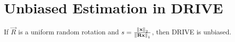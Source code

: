 \documentclass[twoside]{article}
\begin{document}



\section{Unbiased Estimation in DRIVE}

\begin{claim}
    If \(\vec{R}\) is a uniform random rotation and \(s =
    \frac{\left\lVert\boldsymbol{\mathbf{x}}\right\rVert_2}{\left\lVert\boldsymbol{\mathbf{Rx}}\right\rVert_1}\), then DRIVE is unbiased.
\end{claim}
\end{document}
